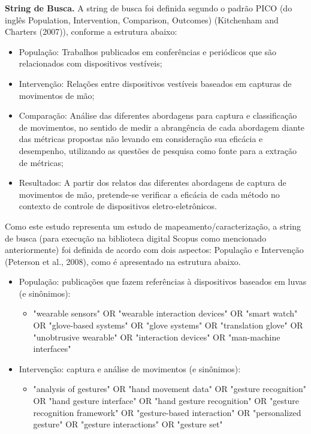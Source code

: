 \textbf{String de Busca.} A string de busca foi definida segundo o padrão PICO (do inglês Population, Intervention,
Comparison, Outcomes) (Kitchenham and Charters (2007)), conforme a estrutura abaixo:

\begin{itemize}
	\item População: Trabalhos publicados em conferências e periódicos que são relacionados com dispositivos vestíveis;
    \item Intervenção: Relações entre dispositivos vestíveis baseados em capturas de movimentos de mão;
    \item Comparação: Análise das diferentes abordagens para captura e classificação de movimentos, no sentido de medir a abrangência de cada abordagem diante das métricas propostas não levando em consideração sua eficácia e desempenho, utilizando as questões de pesquisa como fonte para a extração de métricas;
    \item Resultados: A partir dos relatos das diferentes abordagens de captura de movimentos de mão, pretende-se verificar a eficácia de cada método no contexto de controle de dispositivos eletro-eletrônicos.
\end{itemize}

Como este estudo representa um estudo de mapeamento/caracterização, a string de busca (para execução na biblioteca digital Scopus como mencionado anteriormente) foi definida de acordo com dois aspectos: População e Intervenção (Peterson et al., 2008), como é apresentado na estrutura abaixo.

\begin{itemize}
	\item População: publicações que fazem referências à dispositivos baseados em luvas (e sinônimos):
    \begin{itemize}
    	\item "wearable sensors" OR "wearable interaction devices" OR "smart watch" OR "glove-based systems" OR "glove systems" OR "translation glove" OR "unobtrusive wearable" OR "interaction devices" OR "man-machine interfaces"
    \end{itemize}
    \item Intervenção: captura e análise de movimentos (e sinônimos):
    \begin{itemize}
    	\item "analysis of gestures" OR "hand movement data" OR "gesture recognition" OR "hand gesture interface" OR "hand gesture recognition" OR "gesture recognition framework" OR "gesture-based interaction" OR "personalized gesture" OR "gesture interactions" OR "gesture set"   
    \end{itemize}
\end{itemize}

